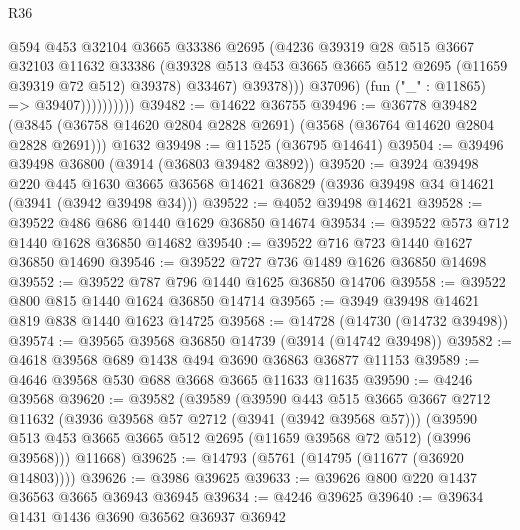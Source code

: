 \begin{lexlean}{R36}
\begin{coremodule}
                              @594
                              @453
                              @32104
                              @3665
                              @33386
                              @2695
                              (@4236
                                @39319
                                @28
                                @515
                                @3667
                                @32103
                                @11632
                                @33386
                                (@39328
                                  @513
                                  @453
                                  @3665
                                  @3665
                                  @512
                                  @2695
                                  (@11659 @39319 @72 @512)
                                  @39378)
                                @33467)
                              @39378)))
                        @37096)
                      (fun ("_" : @11865) => @39407))))))))))
@39482 := @14622 @36755
@39496 := @36778
    @39482
    (@3845 (@36758 @14620 @2804 @2828 @2691) (@3568 (@36764 @14620 @2804 @2828 @2691)))
    @1632
@39498 := @11525 (@36795 @14641)
@39504 := @39496 @39498 @36800 (@3914 (@36803 @39482 @3892))
@39520 := @3924
    @39498
    @220
    @445
    @1630
    @3665
    @36568
    @14621
    @36829
    (@3936 @39498 @34 @14621 (@3941 (@3942 @39498 @34)))
@39522 := @4052 @39498 @14621
@39528 := @39522 @486 @686 @1440 @1629 @36850 @14674
@39534 := @39522 @573 @712 @1440 @1628 @36850 @14682
@39540 := @39522 @716 @723 @1440 @1627 @36850 @14690
@39546 := @39522 @727 @736 @1489 @1626 @36850 @14698
@39552 := @39522 @787 @796 @1440 @1625 @36850 @14706
@39558 := @39522 @800 @815 @1440 @1624 @36850 @14714
@39565 := @3949 @39498 @14621 @819 @838 @1440 @1623 @14725
@39568 := @14728 (@14730 (@14732 @39498))
@39574 := @39565 @39568 @36850 @14739 (@3914 (@14742 @39498))
@39582 := @4618 @39568 @689 @1438 @494 @3690 @36863 @36877 @11153
@39589 := @4646 @39568 @530 @688 @3668 @3665 @11633 @11635
@39590 := @4246 @39568
@39620 := @39582
    (@39589
      (@39590
        @443
        @515
        @3665
        @3667
        @2712
        @11632
        (@3936 @39568 @57 @2712 (@3941 (@3942 @39568 @57)))
        (@39590 @513 @453 @3665 @3665 @512 @2695 (@11659 @39568 @72 @512) (@3996 @39568)))
      @11668)
@39625 := @14793 (@5761 (@14795 (@11677 (@36920 @14803))))
@39626 := @3986 @39625
@39633 := @39626 @800 @220 @1437 @36563 @3665 @36943 @36945
@39634 := @4246 @39625
@39640 := @39634 @1431 @1436 @3690 @36562 @36937 @36942

\end{coremodule}
\end{lexlean}
